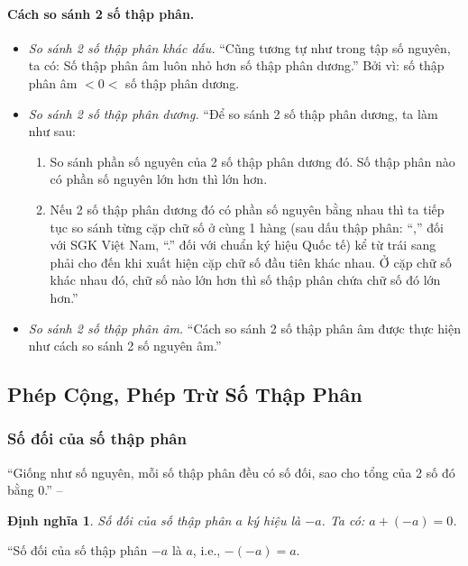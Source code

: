 \documentclass{article}
\numberwithin{equation}{section}
\newtheorem{dinhnghia}{Định nghĩa}[section]
\begin{document}
\paragraph{Cách so sánh 2 số thập phân.}
\begin{itemize}
	\item \textit{So sánh 2 số thập phân khác dấu.} ``Cũng tương tự như trong tập số nguyên, ta có: Số thập phân âm luôn nhỏ hơn số thập phân dương.'' Bởi vì: số thập phân âm $< 0 <$ số thập phân dương.
	\item \textit{So sánh 2 số thập phân dương.} ``Để so sánh 2 số thập phân dương, ta làm như sau:
	\begin{enumerate}
		\item So sánh phần số nguyên của 2 số thập phân dương đó. Số thập phân nào có phần số nguyên lớn hơn thì lớn hơn.
		\item Nếu 2 số thập phân dương đó có phần số nguyên bằng nhau thì ta tiếp tục so sánh từng cặp chữ số ở cùng 1 hàng (sau dấu thập phân: ``,'' đối với SGK Việt Nam, ``.'' đối với chuẩn ký hiệu Quốc tế) kể từ trái sang phải cho đến khi xuất hiện cặp chữ số đầu tiên khác nhau. Ở cặp chữ số khác nhau đó, chữ số nào lớn hơn thì số thập phân chứa chữ số đó lớn hơn.'' 
	\end{enumerate}
	\item \textit{So sánh 2 số thập phân âm.} ``Cách so sánh 2 số thập phân âm được thực hiện như cách so sánh 2 số nguyên âm.'' 
\end{itemize}


\subsection{Phép Cộng, Phép Trừ Số Thập Phân}

\subsubsection{Số đối của số thập phân}
``Giống như số nguyên, mỗi số thập phân đều có số đối, sao cho tổng của 2 số đó bằng 0.'' -- \cite[p. 48]{SGK_Toan_6_Canh_Dieu_tap_2}

\begin{dinhnghia}
	\emph{Số đối} của số thập phân $a$ ký hiệu là $-a$. Ta có: $a + (-a) = 0$.
\end{dinhnghia}
``Số đối của số thập phân $-a$ là $a$, i.e., $-(-a) = a$.
\end{document}
